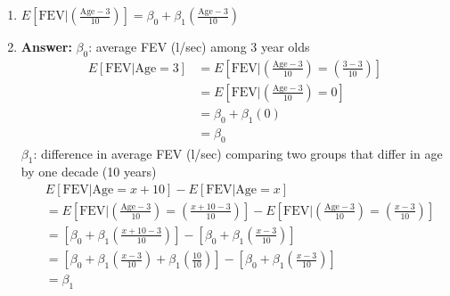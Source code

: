 \documentclass{article}
\begin{document}
\begin{enumerate}
\newpage
\item $E[\text{FEV}|\left(\frac{\text{Age}-3}{10}\right)] = \beta_0 + \beta_1 \left(\frac{\text{Age}-3}{10}\right)$ 
\item[] \color{blue} \textbf{Answer:} 
$\beta_0$: average FEV (l/sec) among 3 year olds \\
\begin{align*}
E[\text{FEV}|\text{Age} =3] &= E[\text{FEV}|\left(\frac{\text{Age}-3}{10}\right)=\left(\frac{3-3}{10}\right)]\\
& = E[\text{FEV}|\left(\frac{\text{Age}-3}{10}\right) =0]\\
& = \beta_0+ \beta_1(0) \\
& = \beta_0
\end{align*}
$\beta_1$: difference in average FEV (l/sec) comparing two groups that differ in age by one decade (10 years)
\begin{align*}
&E[\text{FEV}|\text{Age} = x + 10] - E[\text{FEV}|\text{Age} = x ] \\
&=E[\text{FEV}|\left(\frac{\text{Age}-3}{10}\right)= \left(\frac{x+10-3}{10}\right)] - E[\text{FEV}|\left(\frac{\text{Age}-3}{10}\right)= \left(\frac{x-3}{10}\right)]\\
&=\left[\beta_0 + \beta_1\left(\frac{x+10-3}{10}\right)\right] - \left[\beta_0 + \beta_1\left(\frac{x-3}{10}\right)\right] \\
&=\left[\beta_0 + \beta_1\left(\frac{x-3}{10}\right) + \beta_1\left(\frac{10}{10}\right)\right] -\left[\beta_0 + \beta_1\left(\frac{x-3}{10}\right) \right]\\
& = \beta_1
\end{align*}
\color{black}
\end{enumerate}

\newpage
\end{document}
